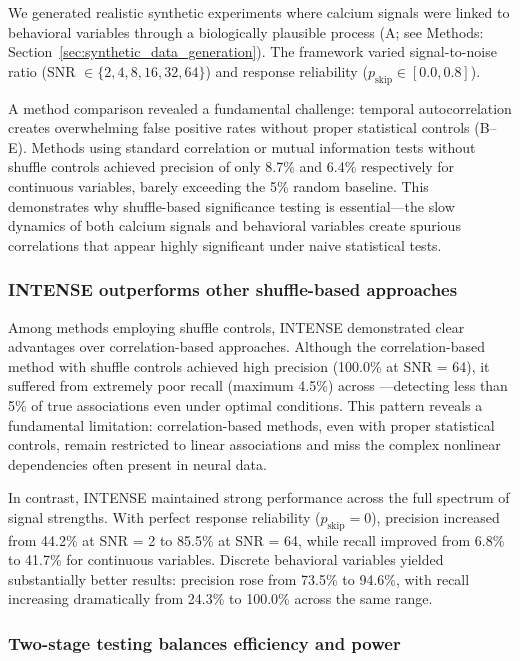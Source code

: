 We generated realistic synthetic experiments where calcium signals were
linked to behavioral variables through a biologically plausible process
(A; see Methods: Section~\ref{sec:synthetic_data_generation}).
The framework varied signal-to-noise ratio
(SNR $\in \{2, 4, 8, 16, 32, 64\}$) and response reliability
($p_{\text{skip}} \in [0.0, 0.8]$).

A method comparison revealed a fundamental challenge: temporal autocorrelation
creates overwhelming false positive rates without proper statistical controls
(B--E). Methods using standard correlation or mutual information
tests without shuffle controls achieved precision of only 8.7\% and 6.4\%
respectively for continuous variables, barely exceeding the 5\% random baseline.
This demonstrates why shuffle-based significance testing is essential---the slow
dynamics of both calcium signals and behavioral variables create spurious
correlations that appear highly significant under naive statistical tests.

\subsubsection{INTENSE outperforms other shuffle-based approaches}
\label{sec:intense_outperforms}

Among methods employing shuffle controls, INTENSE demonstrated clear advantages over
correlation-based approaches. Although the correlation-based method with shuffle controls achieved high
precision (100.0\% at SNR = 64), it suffered from extremely poor recall
(maximum 4.5\%) across
---detecting less than 5\% of true associations even under optimal
conditions. This pattern reveals a fundamental limitation: correlation-based
methods, even with proper statistical controls, remain restricted to linear
associations and miss the complex nonlinear dependencies often present in neural
data.

In contrast, INTENSE maintained strong performance across the full spectrum of
signal strengths. With perfect response reliability ($p_{\text{skip}} = 0$),
precision increased from 44.2\% at SNR = 2 to 85.5\% at SNR = 64, while recall
improved from 6.8\% to 41.7\% for continuous variables.
Discrete behavioral variables yielded substantially better results: precision rose from 73.5\% to
94.6\%, with recall increasing dramatically from 24.3\% to 100.0\% across the same
range.

\subsubsection{Two-stage testing balances efficiency and power}
\label{sec:two_stage_testing}

